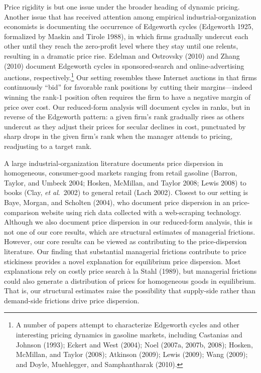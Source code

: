 \documentclass[11pt]{article}
\begin{document}
\begin{spacing}{1.3}
Price rigidity is but one issue under the broader heading of dynamic
pricing. Another issue that has received attention among empirical
industrial-organization economists is documenting the occurrence of
Edgeworth cycles (Edgeworth 1925, formalized by Maskin and Tirole
1988), in which firms gradually undercut each other until they reach
the zero-profit level where they stay until one relents, resulting in
a dramatic price rise.  Edelman and Ostrovsky (2010) and Zhang (2010)
document Edgeworth cycles in sponsored-search and online-advertising
auctions, respectively.\footnote{A number of papers attempt to
  characterize Edgeworth cycles and other interesting pricing dynamics
  in gasoline markets, including Castanias and Johnson (1993); Eckert
  and West (2004); Noel (2007a, 2007b, 2008); Hosken, McMillan, and
  Taylor (2008); Atkinson (2009); Lewis (2009); Wang (2009); and
  Doyle, Muehlegger, and Samphantharak (2010).} Our setting resembles
these Internet auctions in that firms continuously ``bid'' for
favorable rank positions by cutting their margins---indeed winning the
rank-1 position often requires the firm to have a negative margin of
price over cost.  Our reduced-form analysis will document cycles in
ranks, but in reverse of the Edgeworth pattern: a given firm's rank
gradually rises as others undercut as they adjust their prices for
secular declines in cost, punctuated by sharp drops in the given
firm's rank when the manager attends to pricing, readjusting to a
target rank.

A large industrial-organization literature documents price dispersion
in homogeneous, consumer-good markets ranging from retail gasoline
(Barron, Taylor, and Umbeck 2004; Hosken, McMillan, and Taylor 2008;
Lewis 2008) to books (Clay, {\em et al}.\ 2002) to general retail
(Lach 2002). Closest to our setting is Baye, Morgan, and Scholten
(2004), who document price dispersion in an price-comparison website
using rich data collected with a web-scraping technology. Although we
also document price dispersion in our reduced-form analysis, this is
not one of our core results, which are structural estimates of
managerial frictions. However, our core results can be viewed as
contributing to the price-dispersion literature.  Our finding that
substantial managerial frictions contribute to price stickiness
provides a novel explanation for equilibrium price dispersion.  Most
explanations rely on costly price search \`a la Stahl (1989), but
managerial frictions could also generate a distribution of prices for
homogeneous goods in equilibrium.  That is, our structural estimates
raise the possibility that supply-side rather than demand-side
frictions drive price dispersion.


\end{spacing}
\end{document}
